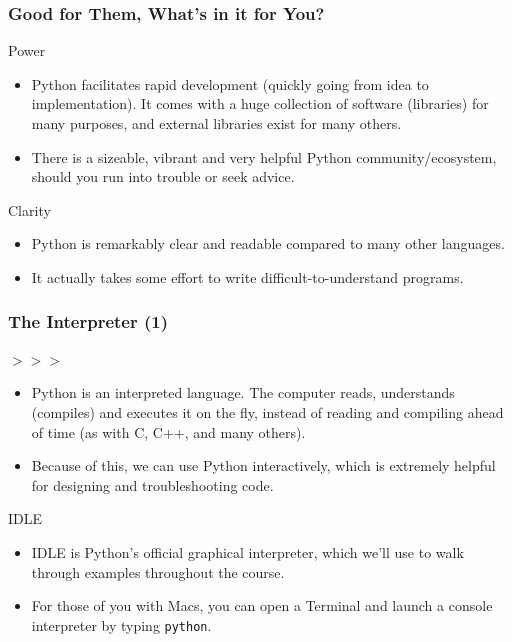 \documentclass[10pt]{beamer}
\begin{document}
\begin{frame}
  \frametitle{Good for Them, What's in it for You?}
  \begin{block}{Power}
    \begin{itemize}
      \item Python facilitates rapid development (quickly going from idea to implementation).
        It comes with a huge collection of software (libraries) for many purposes, and external libraries exist for many others.
      \item There is a sizeable, vibrant and very helpful Python community/ecosystem, should you run into trouble or seek advice.
    \end{itemize}
  \end{block}
  \begin{block}{Clarity}
    \begin{itemize}
      \item Python is remarkably clear and readable compared to many other languages.
      \item It actually takes some effort to write difficult-to-understand programs.
    \end{itemize}
  \end{block}
\end{frame}

\begin{frame}
  \frametitle{The Interpreter (1)}
  \begin{block}{$>>>$}
    \begin{itemize}
      \item Python is an interpreted language.
        The computer reads, understands (compiles) and executes it on the fly, instead of reading and compiling ahead of time (as with C, C++, and many others).
      \item Because of this, we can use Python interactively, which is extremely helpful for designing and troubleshooting code.
    \end{itemize}
  \end{block}
  \begin{block}{IDLE}
    \begin{itemize}
      \item IDLE is Python's official graphical interpreter, which we'll use to walk through examples throughout the course.
      \item For those of you with Macs, you can open a Terminal and launch a console interpreter by typing \texttt{python}.
    \end{itemize}
  \end{block}
\end{frame}
\end{document}
